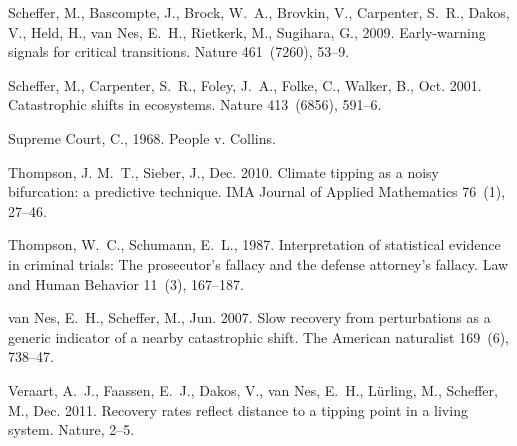 \documentclass[authoryear,review,12pt]{elsarticle}
\begin{document}
\begin{thebibliography}{25}
Scheffer, M., Bascompte, J., Brock, W.~A., Brovkin, V., Carpenter, S.~R.,
  Dakos, V., Held, H., van Nes, E.~H., Rietkerk, M., Sugihara, G., 2009.
  {Early-warning signals for critical transitions.} Nature 461~(7260), 53--9.


Scheffer, M., Carpenter, S.~R., Foley, J.~A., Folke, C., Walker, B., Oct. 2001.
  {Catastrophic shifts in ecosystems.} Nature 413~(6856), 591--6.


{Supreme Court}, C., 1968. {People v. Collins}.

Thompson, J. M.~T., Sieber, J., Dec. 2010. {Climate tipping as a noisy
  bifurcation: a predictive technique}. IMA Journal of Applied Mathematics
  76~(1), 27--46.


Thompson, W.~C., Schumann, E.~L., 1987. {Interpretation of statistical evidence
  in criminal trials: The prosecutor's fallacy and the defense attorney's
  fallacy.} Law and Human Behavior 11~(3), 167--187.


van Nes, E.~H., Scheffer, M., Jun. 2007. {Slow recovery from perturbations as a
  generic indicator of a nearby catastrophic shift.} The American naturalist
  169~(6), 738--47.


Veraart, A.~J., Faassen, E.~J., Dakos, V., van Nes, E.~H., L\"{u}rling, M.,
  Scheffer, M., Dec. 2011. {Recovery rates reflect distance to a tipping point
  in a living system}. Nature, 2--5.


\end{thebibliography}
 
\end{document}
